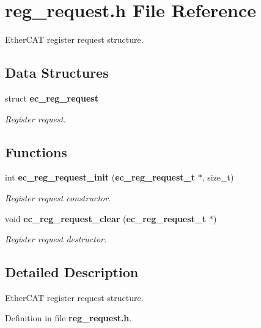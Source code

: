 \section{reg\-\_\-request.\-h \-File \-Reference}
\label{reg__request_8h}


\-Ether\-C\-A\-T register request structure.  


\subsection*{\-Data \-Structures}
\begin{DoxyCompactItemize}
\item 
struct {\bf ec\-\_\-reg\-\_\-request}
\begin{DoxyCompactList}\small\item\em \-Register request. \end{DoxyCompactList}\end{DoxyCompactItemize}
\subsection*{\-Functions}
\begin{DoxyCompactItemize}
\item 
int {\bf ec\-\_\-reg\-\_\-request\-\_\-init} ({\bf ec\-\_\-reg\-\_\-request\-\_\-t} $\ast$, size\-\_\-t)
\begin{DoxyCompactList}\small\item\em \-Register request constructor. \end{DoxyCompactList}\item 
void {\bf ec\-\_\-reg\-\_\-request\-\_\-clear} ({\bf ec\-\_\-reg\-\_\-request\-\_\-t} $\ast$)\label{reg__request_8h_a5614fa1fafcc1fc19898a881e364738c}

\begin{DoxyCompactList}\small\item\em \-Register request destructor. \end{DoxyCompactList}\end{DoxyCompactItemize}


\subsection{\-Detailed \-Description}
\-Ether\-C\-A\-T register request structure. 

\-Definition in file {\bf reg\-\_\-request.\-h}.



